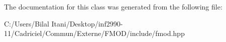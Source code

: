 The documentation for this class was generated from the following file\+:\begin{DoxyCompactItemize}
\item 
C\+:/\+Users/\+Bilal Itani/\+Desktop/inf2990-\/11/\+Cadriciel/\+Commun/\+Externe/\+F\+M\+O\+D/include/fmod.\+hpp\end{DoxyCompactItemize}
